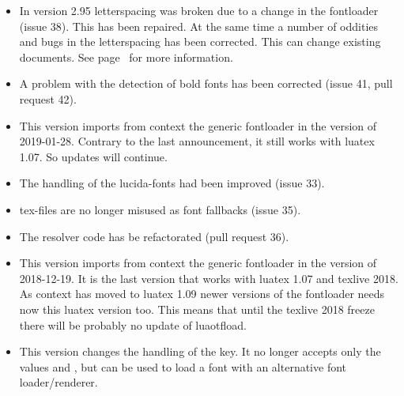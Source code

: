 \begin{itemize}
\item In
version 2.95 letterspacing was broken due to a change in the fontloader (issue 38). This has been repaired. At the same time a number of oddities and bugs in the letterspacing has been corrected. This can change existing documents. See page~\pageref{p:letterspace} for more information.

\item A problem with the detection of bold fonts has been corrected (issue 41, pull request 42).

\end{itemize}
\endsection



\begin{itemize}
\item
This version imports from context the generic fontloader in the version of 2019-01-28. Contrary to the last announcement, it still works with luatex 1.07. So updates will continue.

\item The handling of the lucida-fonts had been improved (issue 33).

\item tex-files are no longer misused as font fallbacks (issue 35).

\item The resolver code has be refactorated (pull request 36).

\end{itemize}
\endsection
{}
\begin{itemize}
\item
This version imports from context the generic fontloader in the version of 2018-12-19. It is the last version that works with luatex 1.07 and texlive 2018. As context has moved to luatex 1.09 newer versions of the fontloader needs now this luatex version too. This means that until the texlive 2018 freeze there will be probably no update of luaotfload.

\item This version changes the handling of the  key. It no longer accepts only the values  and , but can be used to load a font with an alternative font loader/renderer.


\end{itemize}
\endsection

